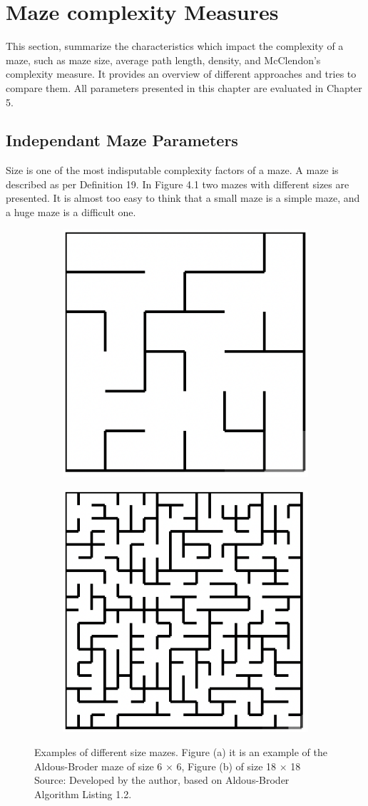 \section{Maze complexity Measures}
This section, summarize the characteristics which impact the complexity of a maze, such as maze size, average path length, density, and McClendon's complexity measure. It provides an overview of different approaches and tries to compare them. All parameters presented in this chapter are evaluated in Chapter 5.
\subsection{Independant Maze Parameters}
Size is one of the most indisputable complexity factors of a maze. A maze is described as per Definition 19. In Figure 4.1 two mazes with different sizes are
presented. It is almost too easy to think that a small maze is a simple maze, and a huge maze is a difficult one.\\
\begin{figure}[!h]
    \centering
    \begin{subfigure}{.5\textwidth}
    \centering
    \includegraphics[width=.5\linewidth]{66}
    \caption{}
\label{fig:sub1}
    \end{subfigure}%
    \begin{subfigure}{.5\textwidth}
    \centering
    \includegraphics[width=.5\linewidth]{1818}
    \caption{}
\label{fig:sub2}
    \end{subfigure}
    \caption{Examples of different size mazes. Figure (a) it is an example of the Aldous-Broder maze of size 6 $\times$ 6, Figure (b) of size 18 $\times$ 18 \\ Source: Developed by the author, based on Aldous-Broder Algorithm Listing 1.2. }
\label{fig:test}
\end{figure}
